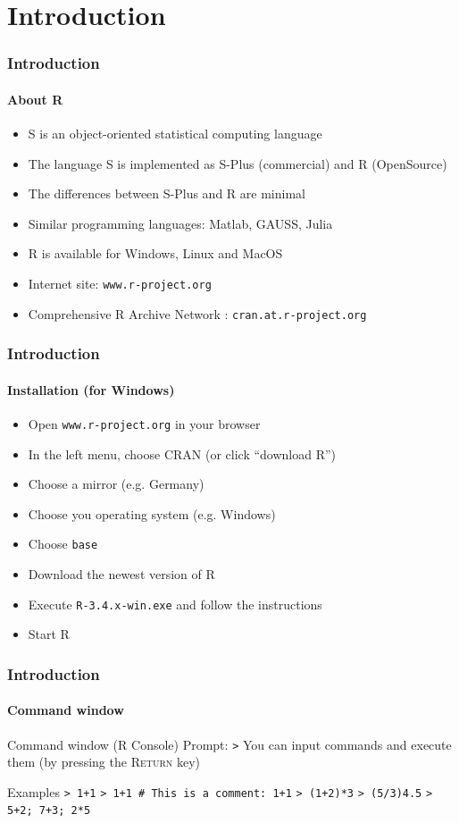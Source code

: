 \documentclass[title={Introduction to R}, author={Mutschler and Zaharieva}, inst={Institute for Econometrics and Empirical Economics}]{beamer}
\begin{document}
\section{Introduction}

\begin{frame}
\frametitle{Introduction}
\framesubtitle{About R}
\begin{itemize}
\item S is an object-oriented statistical computing language
\item The language S is implemented as S-Plus (commercial) \newline
and R (OpenSource)
\item The differences between S-Plus and R are minimal
\item Similar programming languages: Matlab, GAUSS, Julia
\item R is available for Windows, Linux and MacOS
\item Internet site: \texttt{www.r-project.org}
\item Comprehensive R Archive Network : \texttt{cran.at.r-project.org}
\end{itemize}
\end{frame}


\begin{frame}
\frametitle{Introduction}
\framesubtitle{Installation (for Windows)}
\begin{itemize}
\item Open \texttt{www.r-project.org} in your browser
\item In the left menu, choose CRAN (or click \textquotedblleft download
R\textquotedblright )
\item Choose a mirror (e.g. Germany)
\item Choose you operating system (e.g. Windows)
\item Choose \texttt{base}
\item Download the newest version of R
\item Execute \texttt{R-3.4.x-win.exe} and follow the instructions
\item Start R
\end{itemize}
\end{frame}


\begin{frame}
\frametitle{Introduction}
\framesubtitle{Command window}
Command window (R Console)
Prompt: \texttt{>}
You can input commands and execute them \newline
(by pressing the \textsc{Return} key)
\begin{block}{Examples}
\texttt{> 1+1}\newline
\texttt{> 1+1 \# This is a comment: 1+1}\newline
\texttt{> (1+2)*3}\newline
\texttt{> (5/3)4.5}\newline
\texttt{> 5+2; 7+3; 2*5}
\end{block}
\end{frame}
\end{document}

